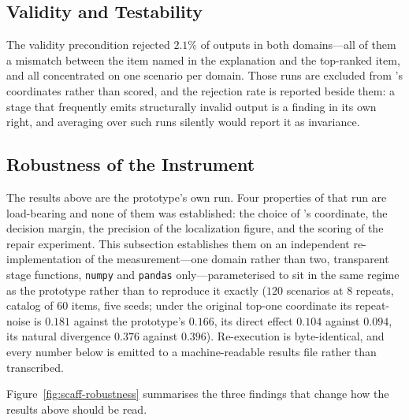 \subsection{Validity and Testability}
\label{sec:controlled-validity}

The validity precondition rejected $2.1\%$ of  outputs in both domains---all of
them a mismatch between the item named in the explanation and the top-ranked item, and all
concentrated on one scenario per domain. Those runs are excluded from 's
coordinates rather than scored, and the rejection rate is reported beside them: a stage that
frequently emits structurally invalid output is a finding in its own right, and averaging over
such runs silently would report it as invariance.

\subsection{Robustness of the Instrument}
\label{sec:controlled-robustness}

The results above are the prototype's own run. Four properties of that run are load-bearing and
none of them was established: the choice of 's coordinate, the decision margin, the
precision of the localization figure, and the scoring of the repair experiment. This subsection
establishes them on an independent re-implementation of the measurement---one domain rather than
two, transparent stage functions, \texttt{numpy} and \texttt{pandas} only---parameterised to sit
in the same regime as the prototype rather than to reproduce it exactly ($120$ scenarios at $8$
repeats, catalog of $60$ items, five seeds; under the original top-one coordinate its
 repeat-noise is $0.181$ against the prototype's $0.166$, its  direct
effect $0.104$ against $0.094$, its  natural divergence $0.376$ against $0.396$).
Re-execution is byte-identical, and every number below is emitted to a machine-readable results
file rather than transcribed.

Figure~\ref{fig:scaff-robustness} summarises the three findings that change how the results above
should be read.

